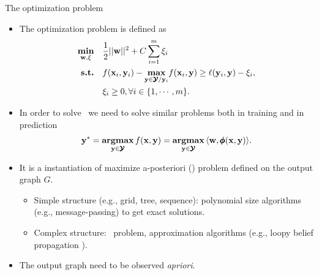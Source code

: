 \documentclass[first=dgreen,second=purple,logo=yellowexc]{aaltoslides}
\begin{document}
{\begin{frame}{The optimization problem}
	\begin{itemize}
		\item The optimization problem is defined as
		\begin{align*}
			\underset{\mathbf {w},\mathbf{\xi}}{\textbf{min}} &\quad {\frac{1}{2}||\mathbf {w}||^2} + {C\sum_{i=1}^m\xi_i}\\
			\textbf{s.t.} &\quad f(\mathbf {x}_i,\mathbf {y}_i) - \underset{\mathbf {y}\in\pmb {\mathcal{Y}}/\mathbf {y}_i}{\textbf{max}}f(\mathbf {x}_i,\mathbf {y}) \ge \ell(\mathbf {y}_i,\mathbf {y}) - \xi_i,\\
			&\quad \xi_i\ge0, \forall i\in\{1,\cdots,m\}.
		\end{align*}
		\item In order to solve \mmcrf\ we need to solve similar problems both in training and in prediction
		\begin{align*}
			\mathbf {y}^*= \underset{\mathbf {y}\in\pmb {\mathcal{Y}}}{\textbf{argmax}} \, f(\mathbf {x},\mathbf {y}) =  \underset{\mathbf {y}\in\pmb {\mathcal{Y}}}{\textbf{argmax}} \,\langle \mathbf {w}, \pmb \phi(\mathbf {x},\mathbf {y}) \rangle.
		\end{align*}
		\item It is a instantiation of maximize a-posteriori (\map) problem defined on the output graph $G$.
		\begin{itemize}
			\footnotesize
			\item Simple structure (e.g., grid, tree, sequence): polynomial size algorithms (e.g., message-passing) to get exact solutions.
			\item Complex structure: \nphard\ problem, approximation algorithms (e.g., loopy belief propagation \citep{Wainwright08graphical}). 
		\end{itemize}
		\item The output graph need to be observed \textit{apriori}.
	\end{itemize}
\end{frame}


}
\end{document}
